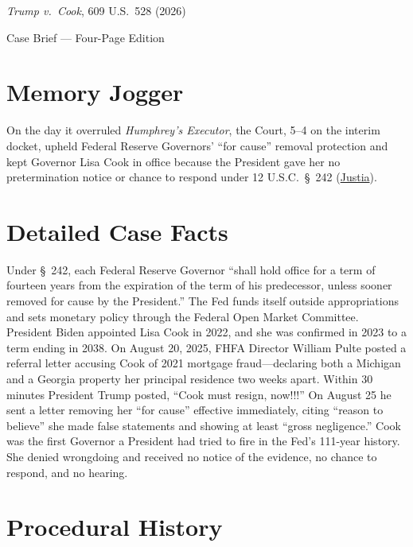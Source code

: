 \documentclass[12pt]{article}
\begin{document}
\begin{center}
{\LARGE \textit{Trump v.\ Cook}, 609 U.S.\ 528 (2026)\par}
\vspace{0.8em}
{\large Case Brief --- Four-Page Edition\par}
\end{center}
\vspace{1em}

\section{Memory Jogger}

On the day it overruled \textit{Humphrey's Executor}, the Court, 5--4 on the interim docket, upheld Federal Reserve Governors' ``for cause'' removal protection and kept Governor Lisa Cook in office because the President gave her no pretermination notice or chance to respond under 12 U.S.C.\ \S~242 (\href{https://supreme.justia.com/cases/federal/us/609/25a312/}{Justia}).

\section{Detailed Case Facts}

Under \S~242, each Federal Reserve Governor ``shall hold office for a term of fourteen years from the expiration of the term of his predecessor, unless sooner removed for cause by the President.'' The Fed funds itself outside appropriations and sets monetary policy through the Federal Open Market Committee. President Biden appointed Lisa Cook in 2022, and she was confirmed in 2023 to a term ending in 2038. On August 20, 2025, FHFA Director William Pulte posted a referral letter accusing Cook of 2021 mortgage fraud---declaring both a Michigan and a Georgia property her principal residence two weeks apart. Within 30 minutes President Trump posted, ``Cook must resign, now!!!'' On August 25 he sent a letter removing her ``for cause'' effective immediately, citing ``reason to believe'' she made false statements and showing at least ``gross negligence.'' Cook was the first Governor a President had tried to fire in the Fed's 111-year history. She denied wrongdoing and received no notice of the evidence, no chance to respond, and no hearing.

\section{Procedural History}
\end{document}

